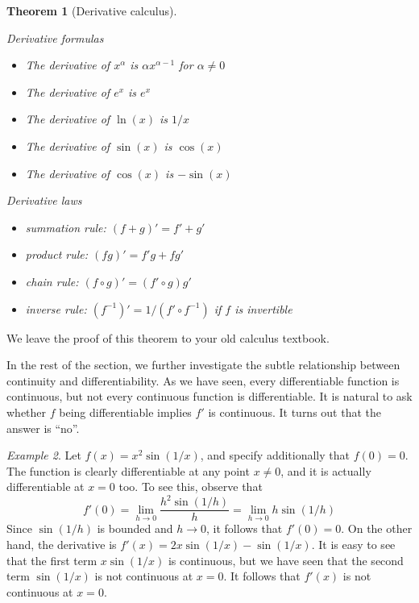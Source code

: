 \documentclass[11pt,oneside]{amsbook}
\theoremstyle{definition}
\theoremstyle{plain}
\newtheorem{thm}{Theorem}[section]
\theoremstyle{definition}
\theoremstyle{remark}
\newtheorem{example}[thm]{Example}
\numberwithin{equation}{section}
\numberwithin{figure}{section}
\begin{document}
\begin{thm}[Derivative calculus]\ 

  Derivative formulas
  \begin{itemize}
  \item The derivative of $x^\alpha$ is $\alpha x^{\alpha-1}$ for $\alpha\neq0$
  \item The derivative of $e^x$ is $e^x$
  \item The derivative of $\ln(x)$ is $1/x$
  \item The derivative of $\sin(x)$ is $\cos(x)$
  \item The derivative of $\cos(x)$ is $-\sin(x)$
  \end{itemize}

  Derivative laws
  \begin{itemize}
  \item summation rule: $(f+g)'=f'+g'$
  \item product rule: $(fg)'=f'g+fg'$
  \item chain rule: $(f\circ g)'=(f'\circ g)g'$
  \item inverse rule: $(f^{-1})'=1/(f'\circ f^{-1})$ if $f$ is invertible
  \end{itemize}
\end{thm}

We leave the proof of this theorem to your old calculus textbook.

In the rest of the section, we further investigate the subtle relationship between continuity and differentiability. As we have seen, every differentiable function is continuous, but not every continuous function is differentiable. It is natural to ask whether $f$ being differentiable implies $f'$ is continuous. It turns out that the answer is ``no''.

\begin{example}
  Let $f(x)=x^2\sin(1/x)$, and specify additionally that $f(0)=0$. The function is clearly differentiable at any point $x\neq0$, and it is actually differentiable at $x=0$ too. To see this, observe that
\[f'(0)=\lim_{h\to0}\frac{h^2\sin(1/h)}{h}=\lim_{h\to0}h\sin(1/h)
\]
Since $\sin(1/h)$ is bounded and $h\to 0$, it follows that $f'(0)=0$. On the other hand, the derivative is $f'(x)=2x\sin(1/x)-\sin(1/x)$. It is easy to see that the first term $x\sin(1/x)$ is continuous, but we have seen that the second term $\sin(1/x)$ is not continuous at $x=0$. It follows that $f'(x)$ is not continuous at $x=0$.
\end{example}
\end{document}
